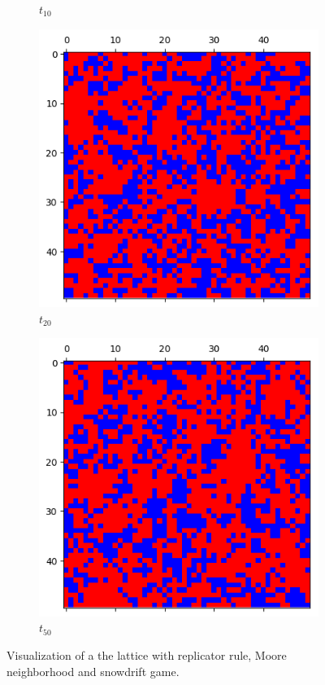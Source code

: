 \documentclass[letterpaper]{article}
\begin{document}
\begin{figure}[H]
\begin{subfigure}{.33\textwidth}
      \caption{$t_{10}$}
      \label{fig:t10_50part2}
    \end{subfigure}
    \begin{subfigure}{.33\textwidth}
      \centering
      \includegraphics[width=1\linewidth]{images/assign2/visu_50-part2/t20}
      \caption{$t_{20}$}
      \label{fig:t20_50part2}
    \end{subfigure}
    \begin{subfigure}{.33\textwidth}
      \centering
      \includegraphics[width=1\linewidth]{images/assign2/visu_50-part2/t50}
      \caption{$t_{50}$}
      \label{fig:t50_50part2}
    \end{subfigure}
    \caption{Visualization of a the lattice with replicator rule,
    Moore neighborhood and snowdrift game.}
    \label{fig:visu50part2}
\end{figure}
\end{document}
